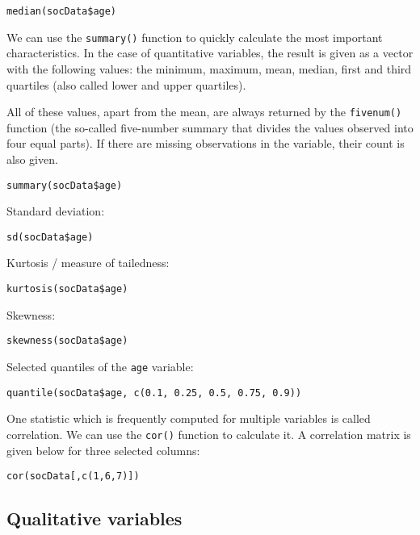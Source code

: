 \documentclass[]{book}
\theoremstyle{definition}
\theoremstyle{definition}
\theoremstyle{definition}
\theoremstyle{remark}
\begin{document}
\begin{verbatim}
median(socData$age)
\end{verbatim}

We can use the \texttt{summary()} function to quickly calculate the most
important characteristics. In the case of quantitative variables, the
result is given as a vector with the following values: the minimum,
maximum, mean, median, first and third quartiles (also called lower and
upper quartiles).

All of these values, apart from the mean, are always returned by the
\texttt{fivenum()} function (the so-called five-number summary that
divides the values observed into four equal parts). If there are missing
observations in the variable, their count is also given.

\begin{verbatim}
summary(socData$age)
\end{verbatim}

Standard deviation:

\begin{verbatim}
sd(socData$age)
\end{verbatim}

Kurtosis / measure of tailedness:

\begin{verbatim}
kurtosis(socData$age)
\end{verbatim}

Skewness:

\begin{verbatim}
skewness(socData$age)
\end{verbatim}

Selected quantiles of the \texttt{age} variable:

\begin{verbatim}
quantile(socData$age, c(0.1, 0.25, 0.5, 0.75, 0.9))
\end{verbatim}

One statistic which is frequently computed for multiple variables is
called correlation. We can use the \texttt{cor()} function to calculate
it. A correlation matrix is given below for three selected columns:

\begin{verbatim}
cor(socData[,c(1,6,7)])
\end{verbatim}

\subsection{Qualitative variables}\label{part_232}
\end{document}
